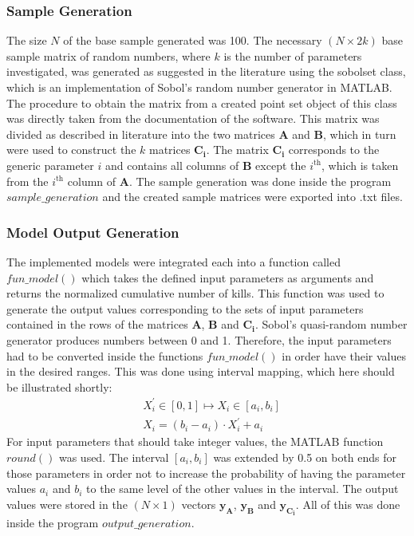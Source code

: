 \documentclass[11pt]{article}
\begin{document}
\subsubsection{Sample Generation}
The size $N$ of the base sample generated was 100. The necessary $(N \times 2k)$ base sample matrix of random numbers, where $k$ is the number of parameters investigated, was generated as suggested in the literature using the sobolset class, which is an implementation of Sobol's random number generator in MATLAB. The procedure to obtain the matrix from a created point set object of this class was directly taken from the documentation of the software. This matrix was divided as described in literature into the two matrices $\boldsymbol{A}$ and $\boldsymbol{B}$, which in turn were used to construct the $k$ matrices $\boldsymbol{C_i}$. The matrix $\boldsymbol{C_i}$ corresponds to the generic parameter $i$ and contains all columns of $\boldsymbol{B}$ except the $i^{\text{th}}$, which is taken from the $i^{\text{th}}$ column of $\boldsymbol{A}$. The sample generation was done inside the program $sample\_generation$ and the created sample matrices were exported into .txt files.

\subsubsection{Model Output Generation}
The implemented models were integrated each into a function called $fun\_model()$ which takes the defined input parameters as arguments and returns the normalized cumulative number of kills. This function was used to generate the output values corresponding to the sets of input parameters contained in the rows of the matrices $\boldsymbol{A}$, $\boldsymbol{B}$ and $\boldsymbol{C_i}$. Sobol's quasi-random number generator produces numbers between 0 and 1. Therefore, the input parameters had to be converted inside the functions $fun\_model()$ in order have their values in the desired ranges. This was done using interval mapping, which here should be illustrated shortly:
\begin{align*}
& X_i^\prime \in [0,1] \longmapsto X_i \in [a_i,b_i]\\
&X_i = (b_i-a_i) \cdot X_i^\prime + a_i
\end{align*}
For input parameters that should take integer values, the MATLAB function $round()$ was used. The interval $[a_i,b_i]$ was extended by 0.5 on both ends for those parameters in order not to increase the probability of having the parameter values $a_i$ and $b_i$ to the same level of the other values in the interval. The output values were stored in the $(N \times 1)$ vectors $\boldsymbol{y_A}$, $\boldsymbol{y_B}$ and $\boldsymbol{y_{C_i}}$. All of this was done inside the program $output\_generation$.
\end{document}
